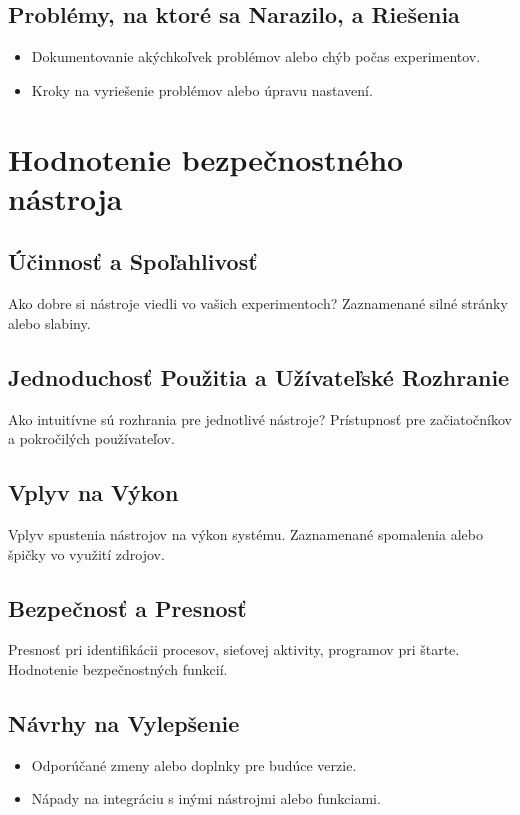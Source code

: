 \documentclass[conference]{IEEEtran}
\begin{document}
\subsection{Problémy, na ktoré sa Narazilo, a Riešenia}
\begin{itemize}
    \item Dokumentovanie akýchkoľvek problémov alebo chýb počas experimentov.
    \item Kroky na vyriešenie problémov alebo úpravu nastavení.
\end{itemize}

\section{Hodnotenie bezpečnostného nástroja}
\subsection{Účinnosť a Spoľahlivosť}
Ako dobre si nástroje viedli vo vašich experimentoch? Zaznamenané silné stránky alebo slabiny.

\subsection{Jednoduchosť Použitia a Užívateľské Rozhranie}
Ako intuitívne sú rozhrania pre jednotlivé nástroje? Prístupnosť pre začiatočníkov a pokročilých používateľov.

\subsection{Vplyv na Výkon}
Vplyv spustenia nástrojov na výkon systému. Zaznamenané spomalenia alebo špičky vo využití zdrojov.

\subsection{Bezpečnosť a Presnosť}
Presnosť pri identifikácii procesov, sieťovej aktivity, programov pri štarte. Hodnotenie bezpečnostných funkcií.

\subsection{Návrhy na Vylepšenie}
\begin{itemize}
    \item Odporúčané zmeny alebo doplnky pre budúce verzie.
    \item Nápady na integráciu s inými nástrojmi alebo funkciami.
\end{itemize}
\end{document}
